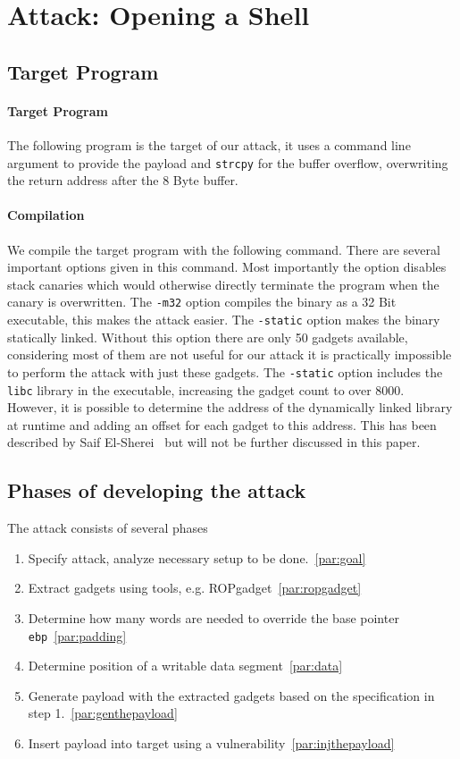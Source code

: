 \documentclass[journal=tosc,submission, notanonymous]{iacrtrans}
\begin{document}
\section{Attack: Opening a Shell}
\label{sec:attack}
\subsection{Target Program}
\paragraph{Target Program}
The following program is the target of our attack, it uses a command line argument to provide the payload and \Verb+strcpy+ for the buffer overflow, overwriting the return address after the 8 Byte buffer.
\paragraph{Compilation}
We compile the target program with the following command. There are several important options given in this command. Most importantly the  option disables stack canaries which would otherwise directly terminate the program when the canary is overwritten. The \Verb+-m32+ option compiles the binary as a 32 Bit executable, this makes the attack easier. The \Verb+-static+ option makes the binary statically linked. Without this option there are only 50 gadgets available, considering most of them are not useful for our attack it is practically impossible to perform the attack with just these gadgets. The \Verb+-static+ option includes the \Verb+libc+ library in the executable, increasing the gadget count to over 8000. However, it is possible to determine the address of the dynamically linked library at runtime and adding an offset for each gadget to this address. This has been described by Saif El-Sherei~\cite{el-sherei} but will not be further discussed in this paper.
\subsection{Phases of developing the attack}
The attack consists of several phases
\begin{enumerate}
  \item Specify attack, analyze necessary setup to be done.~\cref{par:goal}
  \item Extract gadgets using tools, e.g. ROPgadget~\cref{par:ropgadget}
  \item Determine how many words are needed to override the base pointer \Verb+ebp+~\cref{par:padding}
  \item Determine position of a writable data segment~\cref{par:data}
  \item Generate payload with the extracted gadgets based on the specification in step 1.~\cref{par:genthepayload}
  \item Insert payload into target using a vulnerability~\cref{par:injthepayload}
\end{enumerate}
\end{document}
